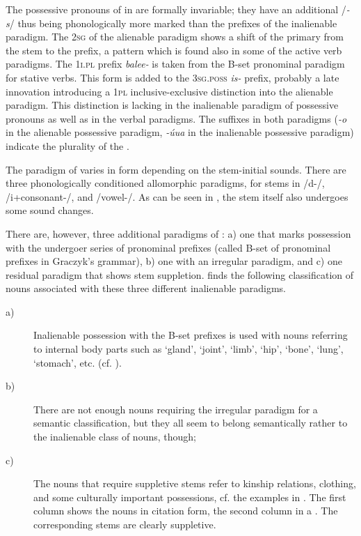 \documentclass[output=paper]{LSP/langsci}
\begin{document}
The possessive pronouns of  in  are formally invariable; they have an additional /\textit{-s}/ thus being phonologically more marked than the prefixes of the inalienable paradigm. The \textsc{2sg}  of the alienable paradigm shows a shift of the primary  from the stem to the prefix, a pattern which is found also in some of the active verb paradigms. The \textsc{1i.pl} prefix \textit{balee-} is taken from the B-set pronominal paradigm for stative verbs. This form is added to the \textsc{3sg.poss} \textit{is-} prefix, probably a late innovation introducing a \textsc{1pl} inclusive-exclusive distinction into the alienable paradigm. This distinction is lacking in the inalienable paradigm of possessive pronouns as well as in the verbal paradigms. The suffixes in both paradigms (\textit{-o} in the alienable possessive paradigm, \textit{-úua} in the inalienable possessive paradigm) indicate the plurality of the .

The paradigm of  varies in form depending on the stem-initial sounds. There are three phonologically conditioned allomorphic paradigms, for stems in /d-/, /i+consonant-/, and /vowel-/. As can be seen in , the stem itself also undergoes some sound changes.

There are, however, three additional paradigms of : a) one that marks possession with the undergoer series of pronominal prefixes (called B-set of pronominal prefixes in Graczyk's grammar), b) one with an irregular paradigm, and c) one residual paradigm that shows stem suppletion. \citet[57]{Graczyk2007} finds the following classification of nouns associated with these three different inalienable paradigms.

\begin{description}
\item[a)] Inalienable possession with the B-set prefixes is used with nouns referring to internal body parts such as `gland', `joint', `limb', `hip', `bone', `lung', `stomach', etc. (cf. \citealt[57]{Graczyk2007}).

\item[b)] There are not enough nouns requiring the irregular paradigm for a semantic classification, but they all seem to belong semantically rather to the inalienable class of nouns, though;

\item[c)] The nouns that require suppletive stems refer to kinship relations, clothing, and some culturally important possessions, cf. the examples in . The first column shows the nouns in citation form, the second column in a . The corresponding stems are clearly suppletive. 
\end{description}
\end{document}
